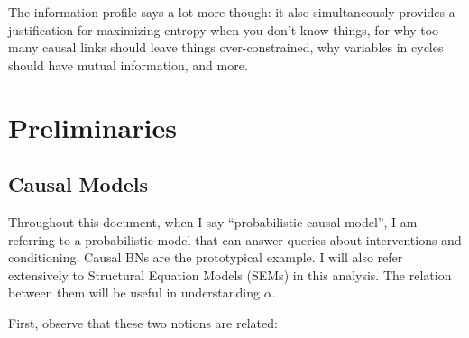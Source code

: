 \documentclass{article}
\theoremstyle{plain}
\theoremstyle{definition}
\theoremstyle{remark}
\begin{document}
\begin{enumerate}[itemsep=1em]
	The information profile says a lot more though: it also simultaneously provides a justification for maximizing entropy when you don't know things, for why too many causal links should leave things over-constrained, why variables in  cycles should have mutual information, and more. 
	
		
	
		
\end{enumerate}



\section{Preliminaries}
\subsection{Causal Models}

Throughout this document, when I say ``probabilistic causal model'', I am referring to a probabilistic model that can answer queries about interventions and conditioning. Causal BNs are the prototypical example. I will also refer extensively to Structural Equation Models (SEMs) in this analysis. The relation between them will be useful in understanding $\alpha$.

First, observe that these two notions are related:
\end{document}
